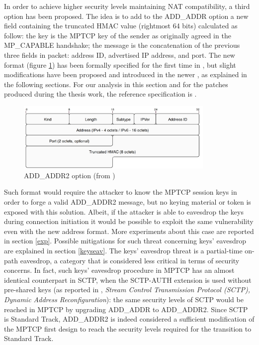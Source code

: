 In order to achieve higher security levels maintaining NAT compatibility, a third option has been proposed. The idea is to add to the ADD\_ADDR option a new field containing the truncated HMAC value (rightmost 64 bits) calculated as follow: the key is the MPTCP key of the sender as originally agreed in the MP\_CAPABLE handshake; the message is the concatenation of the previous three fields in packet: address ID, advertised IP address, and port. The new format (figure \ref{fig:addaddr2}) has been formally specified for the first time in , but slight modifications have been proposed and introduced in the newer , as explained in the following sections. For our analysis in this section and for the patches produced during the thesis work, the reference specification is .

\begin{figure}[!htb]
\centering
\includegraphics[width=0.85\textwidth]{images/addaddr2}
\caption{ADD\_ADDR2 option (from )}
\label{fig:addaddr2}
\end{figure}

Such format would require the attacker to know the MPTCP session keys in order to forge a valid ADD\_ADDR2 message, but no keying material or token is exposed with this solution. Albeit, if the attacker is able to eavesdrop the keys during connection initiation it would be possible to exploit the same vulnerability even with the new address format. More experiments about this case are reported in section \ref{exp}. Possible mitigations for such threat concerning keys' eavesdrop are explained in section \ref{keyseav}. The keys' eavesdrop threat is a partial-time on-path eavesdrop, a category that is considered less critical in terms of security concerns. In fact, such keys' eavesdrop procedure in MPTCP has an almost identical counterpart in SCTP, when the SCTP-AUTH extension is used without pre-shared keys (as reported in , \textit{Stream Control Transmission Protocol (SCTP), Dynamic Address Reconfiguration}): the same security levels of SCTP would be reached in MPTCP by upgrading ADD\_ADDR to ADD\_ADDR2. Since SCTP is Standard Track, ADD\_ADDR2 is indeed considered a sufficient modification of the MPTCP first design to reach the security levels required for the transition to Standard Track.

